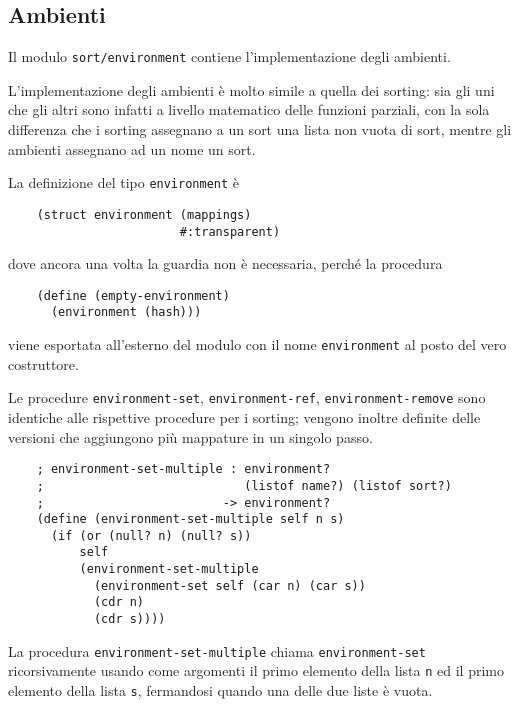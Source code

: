 \subsection{Ambienti}

Il modulo \lstinline{sort/environment} contiene l'implementazione degli
ambienti.

L'implementazione degli ambienti \`e molto simile a quella dei sorting:
sia gli uni che gli altri sono infatti a livello matematico delle
funzioni parziali, con la sola differenza che i sorting assegnano a
un sort una lista non vuota di sort, mentre gli ambienti assegnano ad
un nome un sort.

La definizione del tipo \lstinline{environment} \`e

\begin{lstlisting}
    (struct environment (mappings)
                        #:transparent)
\end{lstlisting}

dove ancora una volta la guardia non \`e necessaria, perch\'e la
procedura

\begin{lstlisting}
    (define (empty-environment)
      (environment (hash)))
\end{lstlisting}

viene esportata all'esterno del modulo con il nome
\lstinline{environment} al posto del vero costruttore.

Le procedure \lstinline{environment-set}, \lstinline{environment-ref},
\lstinline{environment-remove} sono identiche alle rispettive procedure
per i sorting; vengono inoltre definite delle versioni che aggiungono
pi\`u mappature in un singolo passo.

\begin{lstlisting}
    ; environment-set-multiple : environment?
    ;                            (listof name?) (listof sort?)
    ;                         -> environment?
    (define (environment-set-multiple self n s)
      (if (or (null? n) (null? s))
          self
          (environment-set-multiple
            (environment-set self (car n) (car s))
            (cdr n)
            (cdr s))))
\end{lstlisting}

La procedura \lstinline{environment-set-multiple} chiama
\lstinline{environment-set} ricorsivamente usando come argomenti il
primo elemento della lista \lstinline{n} ed il primo elemento della lista
\lstinline{s}, fermandosi quando una delle due liste \`e vuota.

